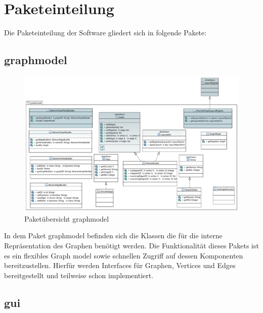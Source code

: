 \chapter{Paketeinteilung}
\label{ch:paketeinteilung}

Die Paketeinteilung der Software gliedert sich in folgende Pakete: %

\section{graphmodel}

\begin{figure}[hb]
  \centering
  \includegraphics[width=380pt]{resourcen/graphmodel.pdf}
  \caption{Paketübersicht graphmodel}
  \label{fig:packge_graphmodel}
\end{figure}

In dem Paket graphmodel befinden sich die Klassen die für die interne Repräsentation des Graphen benötigt werden. Die Funktionalität dieses Pakets ist es ein flexibles Graph model sowie schnellen Zugriff auf dessen Komponenten bereitzustellen. Hierfür werden Interfaces für Graphen, Vertices und Edges bereitgestellt und teilweise schon implementiert. 

\newpage

\section{gui}


